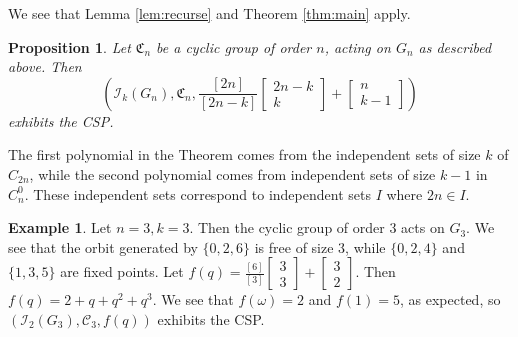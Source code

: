 \documentclass[12pt]{article}
\newtheorem{proposition}[theorem]{Proposition}
\theoremstyle{definition}
\newtheorem{example}[theorem]{Example}
\newcommand{\gau}[2]{\left[ \begin{array}{c} #1 \\ #2 \end{array} \right]}
\begin{document}
We see that Lemma \ref{lem:recurse} and Theorem \ref{thm:main} apply. 
\begin{proposition}
Let $\mathfrak{C}_n$ be a cyclic group of order $n$, acting on $G_n$ as described above. 
Then \[\left(\mathcal{I}_k(G_n), \mathfrak{C}_n, \frac{[2n]}{[2n-k]}\gau{2n-k}{k} + \gau{n}{k-1}\right)\] exhibits the CSP.
\end{proposition}
The first polynomial in the Theorem comes from the independent sets of size $k$ of $C_{2n}$, while the second polynomial comes from independent sets of size $k-1$ in $C_n^0.$ These independent sets correspond to independent sets $I$ where $2n \in I.$

\begin{example}
Let $n = 3, k = 3$. Then the cyclic group of order $3$ acts on $G_3$. We see that the orbit generated by $\{0,2,6\}$ is free of size $3$, while $\{0,2,4\}$ and $\{1,3,5\}$ are fixed points.  Let $f(q) = \frac{[6]}{[3]}\gau{3}{3} + \gau{3}{2}$. Then $f(q) = 2+q+q^2+q^3.$ We see that $f(\omega) = 2$ and $f(1) = 5$, as expected, so $\left(\mathcal{I}_2(G_3), \mathcal{C}_3, f(q)\right)$ exhibits the CSP.
\end{example}




\end{document}
